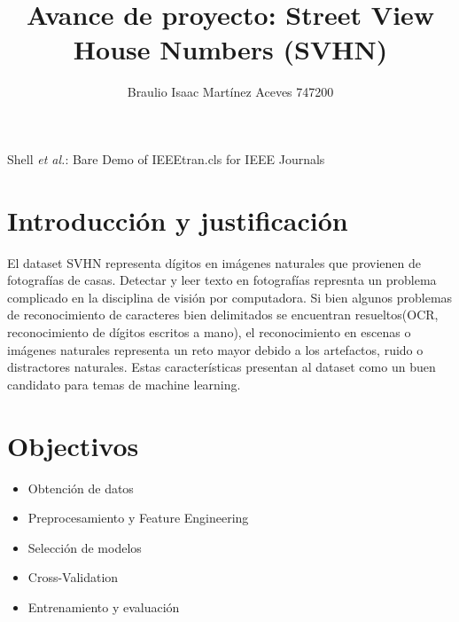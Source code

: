 \documentclass[journal]{IEEEtran}
\begin{document}
\title{Avance de proyecto: Street View House Numbers (SVHN)}

\author {Braulio Isaac Martínez Aceves 747200
        }%
        
{Shell \MakeLowercase{\textit{et al.}}: Bare Demo of IEEEtran.cls for IEEE Journals}

\maketitle


\section{Introducción y justificación}

El dataset SVHN representa dígitos en imágenes naturales que provienen de fotografías de casas. Detectar y leer texto en fotografías represnta un problema complicado en la disciplina de visión por computadora. Si bien algunos problemas de reconocimiento de caracteres bien delimitados se encuentran resueltos(OCR, reconocimiento de dígitos escritos a mano), el reconocimiento en escenas o imágenes naturales representa un reto mayor debido a los artefactos, ruido o distractores naturales.\cite{svhn} Estas características presentan al dataset como un buen candidato para temas de machine learning.

\section{Objectivos}
\begin{itemize}
        \item Obtención de datos
        \item Preprocesamiento y Feature Engineering
        \item Selección de modelos
        \item Cross-Validation
        \item Entrenamiento y evaluación
\end{itemize}
\end{document}
